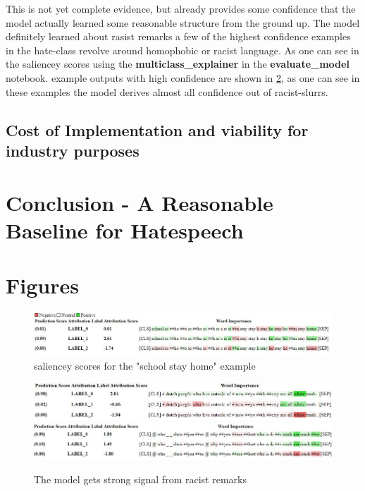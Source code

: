 \documentclass[11pt,a4paper]{article}
\begin{document}
This is not yet complete evidence, but already provides some confidence that the model actually learned some reasonable structure from the ground up.
The model definitely learned about rasist remarks a few of the highest confidence examples in the hate-class revolve around homophobic or racist language.
As one can see in the saliencey scores using the \textbf{multiclass\_explainer} in the \textbf{evaluate\_model} notebook.
 example outputs with high confidence are shown in \ref{fig:racism-example},
  as one can see in these examples the model derives almost all confidence out of racist-slurrs.









\subsection{Cost of Implementation and viability for industry purposes}

\section{Conclusion - A Reasonable Baseline for Hatespeech}



\clearpage 
\appendix

\section{Figures}
\begin{figure}[!ht]
  \includegraphics[width=2\linewidth]{./tables-figures/school-confusion-viz.JPG} 
  \caption{saliencey scores for the "school stay home" example}
  \label{fig:school-saliency}
\end{figure}

\begin{figure}[!ht]
  \includegraphics[width=2\linewidth]{./tables-figures/white-trash-example.JPG} 
  \includegraphics[width=2\linewidth]{./tables-figures/racism-example.JPG} 
  \caption{The model gets strong signal from racist remarks}
  \label{fig:racism-example}
\end{figure}

\end{document}
